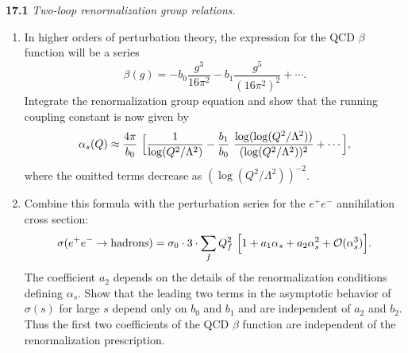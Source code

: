 \textbf{17.1} \emph{Two-loop renormalization group relations.}
\begin{enumerate}[label=(\alph*)]
  \item In higher orders of perturbation theory, the expression for the QCD
    $\beta$ function will be a series
    \begin{equation}
      \beta(g) = -b_0\frac{g^3}{16\pi^2} - b_1\frac{g^5}{(16\pi^2)^2}
        + \cdots .
    \end{equation}
    Integrate the renormalization group equation and show that the running
    coupling constant is now given by
    \begin{equation}
      \alpha_s(Q) \approx \frac{4\pi}{b_0}\ \Bigl[ \frac{1}{\log(Q^2/\Lambda^2)}
        - \frac{b_1}{b_0}\ \frac{\log(\log(Q^2/\Lambda^2))}
          {(\log(Q^2/\Lambda^2))^2} + \cdots \Bigr],
    \end{equation}
    where the omitted terms decrease as $(\log(Q^2/\Lambda^2))^{-2}$.
  \item Combine this formula with the perturbation series for the
    $e^{+}e^{-}$ annihilation cross section:
    \begin{equation}
      \sigma(e^{+}e^{-}\to\text{hadrons}) = \sigma_0\cdot 3\cdot
        \sum_f Q_f^2\ \Bigl[ 1 + a_1\alpha_s + a_2\alpha_s^2
          + \mathcal{O}(\alpha_s^3) \Bigr] .
    \end{equation}
    The coefficient $a_2$ depends on the details of the renormalization
    conditions defining $\alpha_s$.  Show that the leading two terms in the
    asymptotic behavior of $\sigma(s)$ for large $s$ depend only on $b_0$ and
    $b_1$ and are independent of $a_2$ and $b_2$.  Thus the first two
    coefficients of the QCD $\beta$ function are independent of the
    renormalization prescription.
\end{enumerate}

